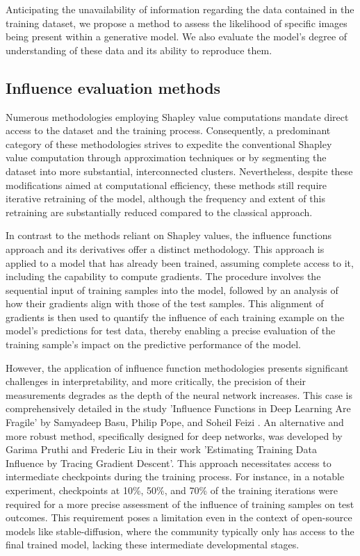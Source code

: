 \documentclass[12pt, letterpaper]{article}
\begin{document}
Anticipating the unavailability of information regarding the data contained in the training dataset, we propose a method to assess the likelihood of specific images being present within a generative model. We also evaluate the model's degree of understanding of these data and its ability to reproduce them.

\subsection{Influence evaluation methods}

Numerous methodologies employing Shapley value computations mandate direct access to the dataset and the training process. Consequently, a predominant category of these methodologies strives to expedite the conventional Shapley value computation through approximation techniques or by segmenting the dataset into more substantial, interconnected clusters. Nevertheless, despite these modifications aimed at computational efficiency, these methods still require iterative retraining of the model, although the frequency and extent of this retraining are substantially reduced compared to the classical approach.

In contrast to the methods reliant on Shapley values, the influence functions \cite{koh2020understanding} approach and its derivatives offer a distinct methodology. This approach is applied to a model that has already been trained, assuming complete access to it, including the capability to compute gradients. The procedure involves the sequential input of training samples into the model, followed by an analysis of how their gradients align with those of the test samples. This alignment of gradients is then used to quantify the influence of each training example on the model's predictions for test data, thereby enabling a precise evaluation of the training sample's impact on the predictive performance of the model.

However, the application of influence function methodologies presents significant challenges in interpretability, and more critically, the precision of their measurements degrades as the depth of the neural network increases. This case is comprehensively detailed in the study 'Influence Functions in Deep Learning Are Fragile' by Samyadeep Basu, Philip Pope, and Soheil Feizi \cite{basu2021influence}. An alternative and more robust method, specifically designed for deep networks, was developed by Garima Pruthi and Frederic Liu in their work 'Estimating Training Data Influence by Tracing Gradient Descent'\cite{pruthi2020estimating}. This approach necessitates access to intermediate checkpoints during the training process. For instance, in a notable experiment, checkpoints at 10\%, 50\%, and 70\% of the training iterations were required for a more precise assessment of the influence of training samples on test outcomes. This requirement poses a limitation even in the context of open-source models like stable-diffusion, where the community typically only has access to the final trained model, lacking these intermediate developmental stages.
\end{document}
